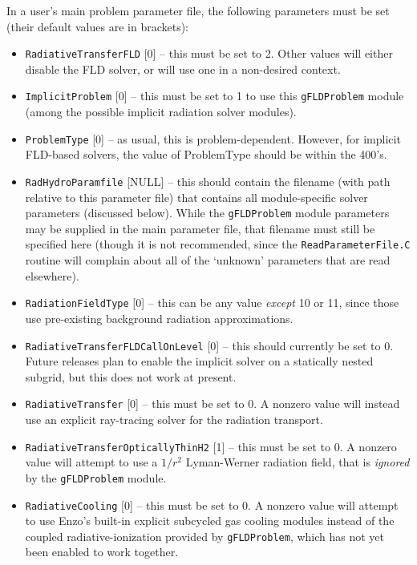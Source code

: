 \documentclass[letterpaper,10pt]{article}
\renewcommand{\(}{\left(}
\renewcommand{\)}{\right)}
\begin{document}
In a user's main problem parameter file, the following parameters
must be set (their default values are in brackets):
\begin{itemize}
\item {\tt RadiativeTransferFLD} [0] -- this must be set to 2.  Other
  values will either disable the FLD solver, or will use one in a
  non-desired context.
\item {\tt ImplicitProblem} [0] -- this must be set to 1 to use this
  {\tt gFLDProblem} module (among the possible implicit radiation solver
  modules).
\item {\tt ProblemType} [0] -- as usual, this is problem-dependent.
  However, for implicit FLD-based solvers, the value of ProblemType
  should be within the 400's.
\item {\tt RadHydroParamfile} [NULL] -- this should contain the filename
  (with path relative to this parameter file) that contains all
  module-specific solver parameters (discussed below).  While the 
  {\tt gFLDProblem} module parameters may be supplied in the main
  parameter file, that filename must still be specified here (though
  it is not recommended, since the {\tt ReadParameterFile.C} routine
  will complain about all of the `unknown' parameters that are read
  elsewhere).
\item {\tt RadiationFieldType} [0] -- this can be any value {\em except}
  10 or 11, since those use pre-existing background radiation
  approximations.
\item {\tt RadiativeTransferFLDCallOnLevel} [0] -- this should currently
  be set to 0.  Future releases plan to enable the implicit solver on
  a statically nested subgrid, but this does not work at present.
\item {\tt RadiativeTransfer} [0] -- this must be set to 0.  A nonzero
  value will instead use an explicit ray-tracing solver for the
  radiation transport. 
\item {\tt RadiativeTransferOpticallyThinH2} [1] -- this must be set
  to 0.  A nonzero value will attempt to use a $1/r^2$ Lyman-Werner
  radiation field, that is {\em ignored} by the {\tt gFLDProblem} module.
\item {\tt RadiativeCooling} [0] -- this must be set to 0.  A nonzero
  value will attempt to use Enzo's built-in explicit subcycled gas
  cooling modules instead of the coupled radiative-ionization provided
  by {\tt gFLDProblem}, which has not yet been enabled to work together. 
\end{itemize}
\end{document}
